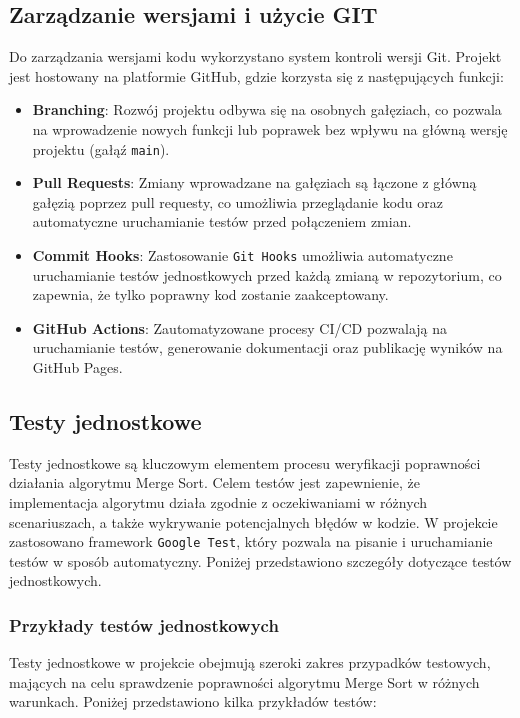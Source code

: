 \subsection{Zarządzanie wersjami i użycie GIT}

Do zarządzania wersjami kodu wykorzystano system kontroli wersji Git. Projekt jest hostowany na platformie GitHub, gdzie korzysta się z następujących funkcji:

\begin{itemize}
  \item \textbf{Branching}: Rozwój projektu odbywa się na osobnych gałęziach, co pozwala na wprowadzenie nowych funkcji lub poprawek bez wpływu na główną wersję projektu (gałąź \texttt{main}).
  \item \textbf{Pull Requests}: Zmiany wprowadzane na gałęziach są łączone z główną gałęzią poprzez pull requesty, co umożliwia przeglądanie kodu oraz automatyczne uruchamianie testów przed połączeniem zmian.
  \item \textbf{Commit Hooks}: Zastosowanie \texttt{Git Hooks} umożliwia automatyczne uruchamianie testów jednostkowych przed każdą zmianą w repozytorium, co zapewnia, że tylko poprawny kod zostanie zaakceptowany.
  \item \textbf{GitHub Actions}: Zautomatyzowane procesy CI/CD pozwalają na uruchamianie testów, generowanie dokumentacji oraz publikację wyników na GitHub Pages.
\end{itemize}

\subsection{Testy jednostkowe}

Testy jednostkowe są kluczowym elementem procesu weryfikacji poprawności działania algorytmu Merge Sort. Celem testów jest zapewnienie, że implementacja algorytmu działa zgodnie z oczekiwaniami w różnych scenariuszach, a także wykrywanie potencjalnych błędów w kodzie. W projekcie zastosowano framework \texttt{Google Test}, który pozwala na pisanie i uruchamianie testów w sposób automatyczny. Poniżej przedstawiono szczegóły dotyczące testów jednostkowych.

\subsubsection{Przykłady testów jednostkowych}

Testy jednostkowe w projekcie obejmują szeroki zakres przypadków testowych, mających na celu sprawdzenie poprawności algorytmu Merge Sort w różnych warunkach. Poniżej przedstawiono kilka przykładów testów:

